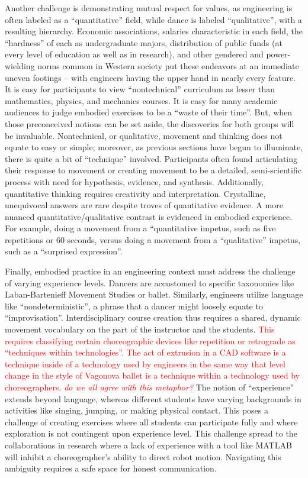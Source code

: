 \documentclass[arts,article,submit,moreauthors,pdftex,10pt,a4paper]{mdpi}
\begin{document}
Another challenge is demonstrating mutual respect for values, as engineering is often labeled as a ``quantitative'' field, while dance is labeled ``qualitative'', with a resulting hierarchy.  Economic associations, salaries characteristic in each field, the ``hardness'' of each as undergraduate majors, distribution of public funds (at every level of education as well as in research), and other gendered and power-wielding norms common in Western society put these endeavors at an immediate uneven footings -- with engineers having the upper hand in nearly every feature.  It is easy for participants to view ``nontechnical'' curriculum as lesser than mathematics, physics, and mechanics courses.  It is easy for many academic audiences to judge embodied exercises to be a ``waste of their time''.  But, when those preconceived notions can be set aside, the discoveries for both groups will be invaluable.  Nontechnical, or qualitative, movement and thinking does not equate to easy or simple; moreover, as previous sections have begun to illuminate, there is quite a bit of ``technique'' involved.  Participants often found articulating their response to movement or creating movement to be a detailed, semi-scientific process with need for hypothesis, evidence, and synthesis.  Additionally, quantitative thinking requires creativity and interpretation.  Crystalline, unequivocal answers are rare despite troves of quantitative evidence.  A more nuanced quantitative/qualitative contrast is evidenced in embodied experience.  For example, doing a movement from a ``quantitative
 impetus, such as five repetitions or 60 seconds, versus doing a movement from a ``qualitative'' impetus, such as a ``surprised expression''.  
        
Finally, embodied practice in an engineering context must address the challenge of varying experience levels.  Dancers are accustomed to specific taxonomies like Laban-Bartenieff Movement Studies or ballet.  Similarly, engineers utilize language like ``nondeterministic'', a phrase that a dancer might loosely equate to ``improvisation''.  Interdisciplinary course creation thus requires a shared, dynamic movement vocabulary on the part of the instructor and the students.  \textcolor{red}{This requires classifying certain choreographic devices like repetition or retrograde as ``techniques within technologies''.  The act of extrusion in a CAD software is a technique inside of a technology used by engineers in the same way that level change in the style of Vagonova ballet is a technique within a technology used by choreographers. \textit{do we all agree with this metaphor?}}  The notion of ``experience'' extends beyond language, whereas different students have varying backgrounds in activities like singing, jumping, or making physical contact.  This poses a challenge of creating exercises where all students can participate fully and where exploration is not contingent upon experience level.  This challenge spread to the collaborations in research where a lack of experience with a tool like MATLAB will inhibit a choreographer's ability to direct robot motion.  Navigating this ambiguity requires a safe space for honest communication.
\end{document}
